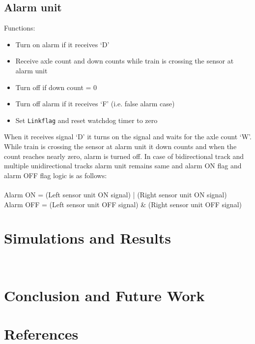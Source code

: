 \documentclass[aps,letterpaper,11pt]{article}
\begin{document}
\subsection{Alarm unit}
Functions:
\begin{itemize}
\item Turn on alarm if it receives `D'
\item Receive axle count and down counts while train is crossing the sensor at alarm unit
\item Turn off if down count = 0
\item Turn off alarm if it receives `F' (i.e. false alarm case)
\item Set \texttt{Linkflag} and reset watchdog timer to zero
\end{itemize}
When it receives signal `D' it turns on the signal and waits for the axle
count `W'. While train is crossing the sensor at alarm unit it down counts and
when the count reaches nearly zero, alarm is turned off.
In case of bidirectional track and multiple unidirectional tracks alarm unit
remains same and alarm ON flag and alarm OFF flag logic is as follows: \\ \\
Alarm ON = (Left sensor unit ON signal) | (Right sensor unit ON signal) \\
Alarm OFF = (Left sensor unit OFF signal) \& (Right sensor unit OFF signal) \\


\section{Simulations and Results}\

\section{Conclusion and Future Work}

\section{References}
\end{document}
